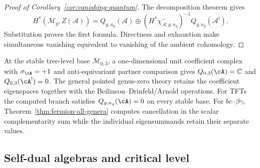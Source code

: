 \begin{proof}[Proof of Corollary~\ref{cor:vanishing-quantum}]
The decomposition theorem gives
\begin{equation}
H^*(\overline{\mathcal{M}}_g,Z(\mathcal{A}))
=Q_{g,n_g}(\mathcal{A})\oplus
(H^*\chi^-_{\mathcal A;g,n_g})^{-1}Q_{g,n_g}(\mathcal{A}^!).
\end{equation}
Substitution proves the first formula.  Directness and exhaustion make
simultaneous vanishing equivalent to vanishing of the ambient
cohomology.
\end{proof}

\begin{remark}
At the stable tree-level base \(\overline{\mathcal M}_{0,3}\), a
one-dimensional unit coefficient complex with
\(\sigma_{\cA}=+1\) and anti-equivariant partner comparison gives
$Q_{0,3}(\cA)=\mathbb C$ and $Q_{0,3}(\cA^!)=0$.
The general pointed genus-zero theory retains the coefficient
eigenspaces together with the Beilinson--Drinfeld/Arnold operations.
For TFTs the computed branch satisfies $Q_{g,n_g}(\cA)=0$ on every
stable base.  For $bc$--$\beta\gamma$,
Theorem~\ref{thm:fermion-all-genera} computes cancellation in the
scalar complementarity sum while the individual eigensummands retain
their separate values.
\end{remark}

\subsection{Self-dual algebras and critical level}

